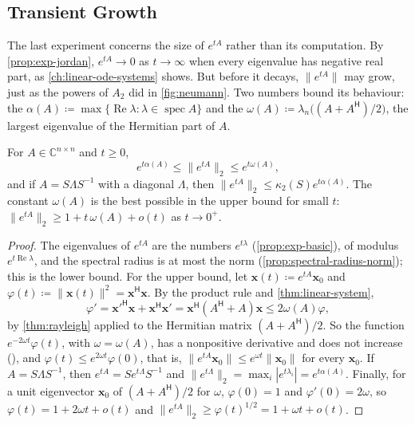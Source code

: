 \subsection{Transient Growth}

The last experiment concerns the size of $e^{tA}$ rather than its computation. By \cref{prop:exp-jordan}, $e^{tA}\to0$ as $t\to\infty$ when every eigenvalue has negative real part, as \cref{ch:linear-ode-systems} shows. But before it decays, $\|e^{tA}\|$ may grow, just as the powers of $A_2$ did in \cref{fig:neumann}. Two numbers bound its behaviour: the  $\alpha(A)\coloneqq\max\{\operatorname{Re}\lambda:\lambda\in\operatorname{spec}A\}$ and the  $\omega(A)\coloneqq\lambda_n\bigl((A+A^{\mathsf H})/2\bigr)$, the largest eigenvalue of the Hermitian part of $A$.

\begin{proposition}
\label{prop:exp-norm-bounds}
For $A\in\mathbb C^{n\times n}$ and $t\ge0$,
\[
e^{t\alpha(A)}\le\|e^{tA}\|_2\le e^{t\omega(A)} ,
\]
and if $A=S\Lambda S^{-1}$ with a diagonal $\Lambda$, then $\|e^{tA}\|_2\le\kappa_2(S)e^{t\alpha(A)}$. The constant $\omega(A)$ is the best possible in the upper bound for small $t$: $\|e^{tA}\|_2\ge1+t\,\omega(A)+o(t)$ as $t\to0^+$.
\end{proposition}

\begin{proof}
The eigenvalues of $e^{tA}$ are the numbers $e^{t\lambda}$ (\cref{prop:exp-basic}), of modulus $e^{t\operatorname{Re}\lambda}$, and the spectral radius is at most the norm (\cref{prop:spectral-radius-norm}); this is the lower bound. For the upper bound, let $\mathbf x(t)\coloneqq e^{tA}\mathbf x_0$ and $\varphi(t)\coloneqq\|\mathbf x(t)\|^2=\mathbf x^{\mathsf H}\mathbf x$. By the product rule and \cref{thm:linear-system},
\[
\varphi'=\mathbf x'^{\mathsf H}\mathbf x+\mathbf x^{\mathsf H}\mathbf x'=\mathbf x^{\mathsf H}(A^{\mathsf H}+A)\mathbf x\le2\omega(A)\varphi ,
\]
by \cref{thm:rayleigh} applied to the Hermitian matrix $(A+A^{\mathsf H})/2$. So the function $e^{-2\omega t}\varphi(t)$, with $\omega=\omega(A)$, has a nonpositive derivative and does not increase (), and $\varphi(t)\le e^{2\omega t}\varphi(0)$, that is, $\|e^{tA}\mathbf x_0\|\le e^{\omega t}\|\mathbf x_0\|$ for every $\mathbf x_0$. If $A=S\Lambda S^{-1}$, then $e^{tA}=Se^{t\Lambda}S^{-1}$ and $\|e^{t\Lambda}\|_2=\max_i|e^{t\lambda_i}|=e^{t\alpha(A)}$. Finally, for a unit eigenvector $\mathbf x_0$ of $(A+A^{\mathsf H})/2$ for $\omega$, $\varphi(0)=1$ and $\varphi'(0)=2\omega$, so $\varphi(t)=1+2\omega t+o(t)$ and $\|e^{tA}\|_2\ge\varphi(t)^{1/2}=1+\omega t+o(t)$.
\end{proof}

